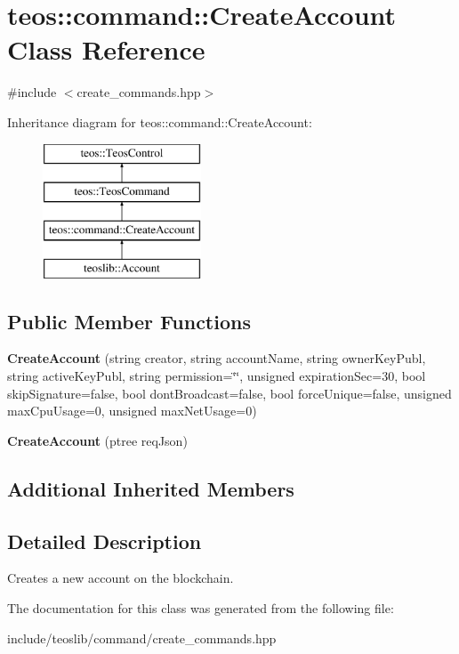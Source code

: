 \hypertarget{classteos_1_1command_1_1_create_account}{}\section{teos\+:\+:command\+:\+:Create\+Account Class Reference}
\label{classteos_1_1command_1_1_create_account}


{\ttfamily \#include $<$create\+\_\+commands.\+hpp$>$}

Inheritance diagram for teos\+:\+:command\+:\+:Create\+Account\+:\begin{figure}[H]
\begin{center}
\leavevmode
\includegraphics[height=4.000000cm]{classteos_1_1command_1_1_create_account}
\end{center}
\end{figure}
\subsection*{Public Member Functions}
\begin{DoxyCompactItemize}
\item 
\mbox{\label{classteos_1_1command_1_1_create_account_aa5fc119e457ddaa39bb04d94c95430c2}} 
{\bfseries Create\+Account} (string creator, string account\+Name, string owner\+Key\+Publ, string active\+Key\+Publ, string permission=\char`\"{}\char`\"{}, unsigned expiration\+Sec=30, bool skip\+Signature=false, bool dont\+Broadcast=false, bool force\+Unique=false, unsigned max\+Cpu\+Usage=0, unsigned max\+Net\+Usage=0)
\item 
\mbox{\label{classteos_1_1command_1_1_create_account_a5431fb149148b10c14e59b4fc0e99fbd}} 
{\bfseries Create\+Account} (ptree req\+Json)
\end{DoxyCompactItemize}
\subsection*{Additional Inherited Members}


\subsection{Detailed Description}
Creates a new account on the blockchain. 

The documentation for this class was generated from the following file\+:\begin{DoxyCompactItemize}
\item 
include/teoslib/command/create\+\_\+commands.\+hpp\end{DoxyCompactItemize}
